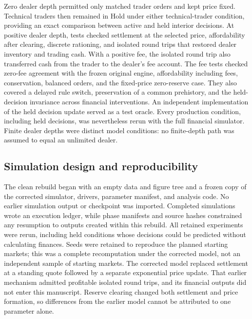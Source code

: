 Zero dealer depth permitted only matched trader orders and kept price fixed.
Technical traders then remained in Hold under either technical-trader condition,
providing an exact comparison between active and held interior decisions.
At positive dealer depth, tests checked settlement at the selected price,
affordability after clearing, discrete rationing, and isolated round
trips that restored dealer inventory and trading cash. With a positive
fee, the isolated round trip also transferred cash from the trader to the
dealer's fee account. The fee tests checked zero-fee agreement with the
frozen original engine, affordability including fees, conservation,
balanced orders, and the fixed-price zero-reserve case. They also
covered a delayed rule switch, preservation of a common prehistory, and
the held-decision
invariance across financial interventions. An independent implementation
of the held decision update served as a test oracle. Every production
condition, including held decisions, was nevertheless rerun with the full
financial simulator. Finite dealer depths were distinct model conditions: no
finite-depth path was assumed to equal an unlimited dealer.

\subsection{Simulation design and reproducibility}

The clean rebuild began with an empty data and figure tree and a frozen
copy of the corrected simulator, drivers, parameter manifest, and analysis
code. No earlier simulation output or checkpoint was imported. Completed
simulations wrote an execution ledger, while phase manifests and source
hashes constrained any resumption to outputs created within this rebuild.
All retained experiments were rerun, including held conditions whose
decisions could be predicted without calculating finances. Seeds were
retained to reproduce the planned starting markets; this was a complete
recomputation under the corrected model, not an independent sample of
starting markets. The corrected model replaced settlement at a standing
quote followed by a separate exponential price update. That earlier
mechanism admitted profitable isolated round trips, and its financial
outputs did not enter this manuscript. Reserve clearing changed both
settlement and price formation, so differences from the earlier model
cannot be attributed to one parameter alone.

